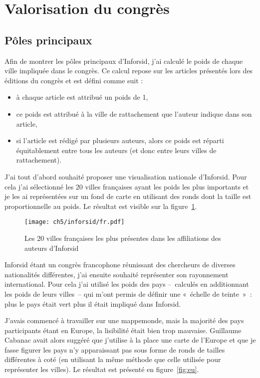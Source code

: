 	\section{Valorisation du congrès}
	
		\subsection{Pôles principaux}
			Afin de montrer les pôles principaux d'Inforsid, j'ai calculé le poids de chaque ville impliquée dans le congrès. Ce calcul repose sur les articles présentés lors des éditions du congrès et est défini comme suit :
			\begin{itemize}
				\item à chaque article est attribué un poids de 1,
				\item ce poids est attribué à la ville de rattachement que l'auteur indique dans son article,
				\item si l'article est rédigé par plusieurs auteurs, alors ce poids est réparti équitablement entre tous les auteurs (et donc entre leurs villes de rattachement).
			\end{itemize}
		
			J'ai tout d'abord souhaité proposer une visualisation nationale d'Inforsid. Pour cela j'ai sélectionné les 20 villes françaises ayant les poids les plus importants et je les ai représentées sur un fond de carte en utilisant des ronds dont la taille est proportionnelle au poids. Le résultat est visible sur la figure~\ref{fig:fr}.
			
			\begin{figure}[h]
				\centering
				\texttt{[image: ch5/inforsid/fr.pdf]}
				\caption{Les 20 villes françaises les plus présentes dans les affiliations des auteurs d'Inforsid}\label{fig:fr}
			\end{figure}
		
			Inforsid étant un congrès francophone réunissant des chercheurs de diverses nationalités différentes, j'ai ensuite souhaité représenter son rayonnement international. Pour cela j'ai utilisé les poids des pays --~calculés en additionnant les poids de leurs villes~-- qui m'ont permis de définir une «~échelle de teinte~»~: plus le pays était vert plus il était impliqué dans Inforsid.
			
			J'avais commencé à travailler sur une mappemonde, mais la majorité des pays participants étant en Europe, la lisibilité était bien trop mauvaise. Guillaume Cabanac avait alors suggéré que j'utilise à la place une carte de l'Europe et que je fasse figurer les pays n'y apparaissant pas sous forme de ronds de tailles différentes à coté (en utilisant la même méthode que celle utilisée pour représenter les villes). Le résultat est présenté en figure~\ref{fig:eu}.
			
